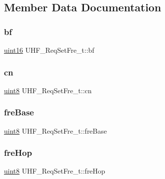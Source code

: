 \subsection{Member Data Documentation}
\mbox{\label{struct_u_h_f___req_set_fre__t_a8f62c70752fadc3961910e2439e9e024}} 
\subsubsection{\texorpdfstring{bf}{bf}}
{\footnotesize\ttfamily \mbox{\hyperlink{m900dll_8h_a05f6b0ae8f6a6e135b0e290c25fe0e4e}{uint16}} U\+H\+F\+\_\+\+Req\+Set\+Fre\+\_\+t\+::bf}

\mbox{\label{struct_u_h_f___req_set_fre__t_a0aa3a630e4bb8f0c8490d44daba6c830}} 
\subsubsection{\texorpdfstring{cn}{cn}}
{\footnotesize\ttfamily \mbox{\hyperlink{m900dll_8h_adde6aaee8457bee49c2a92621fe22b79}{uint8}} U\+H\+F\+\_\+\+Req\+Set\+Fre\+\_\+t\+::cn}

\mbox{\label{struct_u_h_f___req_set_fre__t_ad987d4e21fc79b8e298fad62ebb3abf9}} 
\subsubsection{\texorpdfstring{freBase}{freBase}}
{\footnotesize\ttfamily \mbox{\hyperlink{m900dll_8h_adde6aaee8457bee49c2a92621fe22b79}{uint8}} U\+H\+F\+\_\+\+Req\+Set\+Fre\+\_\+t\+::fre\+Base}

\mbox{\label{struct_u_h_f___req_set_fre__t_a82519ffab1150c781e96fecc9523b112}} 
\subsubsection{\texorpdfstring{freHop}{freHop}}
{\footnotesize\ttfamily \mbox{\hyperlink{m900dll_8h_adde6aaee8457bee49c2a92621fe22b79}{uint8}} U\+H\+F\+\_\+\+Req\+Set\+Fre\+\_\+t\+::fre\+Hop}

